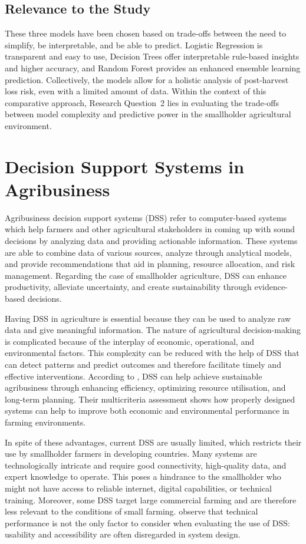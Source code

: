\subsection{Relevance to the Study}

These three models have been chosen based on trade-offs between the need to simplify, be
interpretable, and be able to predict. Logistic Regression is transparent and easy to use, Decision
Trees offer interpretable rule-based insights and higher accuracy, and Random Forest provides an
enhanced ensemble learning prediction. Collectively, the models allow for a holistic analysis of
post-harvest loss risk, even with a limited amount of data. Within the context of this comparative
approach, Research Question~2 lies in evaluating the trade-offs between model complexity and
predictive power in the smallholder agricultural environment.


\section{Decision Support Systems in Agribusiness}

Agribusiness decision support systems (DSS) refer to computer-based systems which help farmers and
other agricultural stakeholders in coming up with sound decisions by analyzing data and providing
actionable information. These systems are able to combine data of various sources, analyze through
analytical models, and provide recommendations that aid in planning, resource allocation, and risk
management. Regarding the case of smallholder agriculture, DSS can enhance productivity, alleviate
uncertainty, and create sustainability through evidence-based decisions.

Having DSS in agriculture is essential because they can be used to analyze raw data and give
meaningful information. The nature of agricultural decision-making is complicated because of the
interplay of economic, operational, and environmental factors. This complexity can be reduced with
the help of DSS that can detect patterns and predict outcomes and therefore facilitate timely and
effective interventions. According to \cite{duan2021multicriteria}, DSS can help achieve sustainable
agribusiness through enhancing efficiency, optimizing resource utilisation, and long-term planning.
Their multicriteria assessment shows how properly designed systems can help to improve both economic
and environmental performance in farming environments.

In spite of these advantages, current DSS are usually limited, which restricts their use by
smallholder farmers in developing countries. Many systems are technologically intricate and require
good connectivity, high-quality data, and expert knowledge to operate. This poses a hindrance to
the smallholder who might not have access to reliable internet, digital capabilities, or technical
training. Moreover, some DSS target large commercial farming and are therefore less relevant to
the conditions of small farming. \cite{duan2021multicriteria} observe that technical performance is
not the only factor to consider when evaluating the use of DSS: usability and accessibility are
often disregarded in system design.

